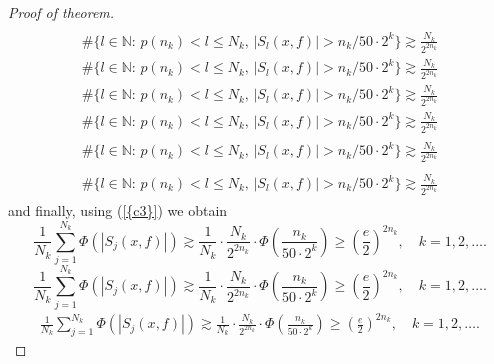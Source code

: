 \documentclass{amsart}
\numberwithin{equation}{section}
\begin{document}
\begin{proof}[Proof of theorem]
{\begin{align}
\end{align}\fi    
{}\begin{gather*}
\#\{l\in {\ensuremath{\mathbb N}}:\,p(n_k)<l\le N_k,\, |S_l(x,f)|> n_k/50\cdot  2^k \}\gtrsim \frac{N_k}{2^{2n_k}}
\end{gather*}\fi  
{}\begin{gather}
\#\{l\in {\ensuremath{\mathbb N}}:\,p(n_k)<l\le N_k,\, |S_l(x,f)|> n_k/50\cdot  2^k \}\gtrsim \frac{N_k}{2^{2n_k}}
\end{gather}\fi   
{}\begin{multline*}
\#\{l\in {\ensuremath{\mathbb N}}:\,p(n_k)<l\le N_k,\, |S_l(x,f)|> n_k/50\cdot  2^k \}\gtrsim \frac{N_k}{2^{2n_k}}
\end{multline*}\fi  
{}\begin{multline}
\#\{l\in {\ensuremath{\mathbb N}}:\,p(n_k)<l\le N_k,\, |S_l(x,f)|> n_k/50\cdot  2^k \}\gtrsim \frac{N_k}{2^{2n_k}}
\end{multline}\fi  
{}\begin{multline*}\begin{split}
\#\{l\in {\ensuremath{\mathbb N}}:\,p(n_k)<l\le N_k,\, |S_l(x,f)|> n_k/50\cdot  2^k \}\gtrsim \frac{N_k}{2^{2n_k}}
\end{split}\end{multline*}\fi
{}\begin{multline}\begin{split}
\#\{l\in {\ensuremath{\mathbb N}}:\,p(n_k)<l\le N_k,\, |S_l(x,f)|> n_k/50\cdot  2^k \}\gtrsim \frac{N_k}{2^{2n_k}}
\end{split}\end{multline}\fi
}
and finally,  using {(\ref{{c3}})} we obtain
{
\begin{equation*} 
\frac{1}{N_k}\sum_{j=1}^{N_k}\Phi(|S_j(x,f)|)\gtrsim\frac{1}{N_k}\cdot\frac{N_k}{2^{2n_k}}\cdot\Phi\left( \frac{n_k}{50\cdot  2^k }\right)\ge \left(\frac{e}{2}\right)^{2n_k},\quad k=1,2,\ldots.
 \end{equation*}\fi  
{}\begin{equation}
\frac{1}{N_k}\sum_{j=1}^{N_k}\Phi(|S_j(x,f)|)\gtrsim\frac{1}{N_k}\cdot\frac{N_k}{2^{2n_k}}\cdot\Phi\left( \frac{n_k}{50\cdot  2^k }\right)\ge \left(\frac{e}{2}\right)^{2n_k},\quad k=1,2,\ldots.
\end{equation}\fi   
{}\begin{align*}
\frac{1}{N_k}\sum_{j=1}^{N_k}\Phi(|S_j(x,f)|)\gtrsim\frac{1}{N_k}\cdot\frac{N_k}{2^{2n_k}}\cdot\Phi\left( \frac{n_k}{50\cdot  2^k }\right)\ge \left(\frac{e}{2}\right)^{2n_k},\quad k=1,2,\ldots.

\end{align*}}
\end{proof}
\end{document}
